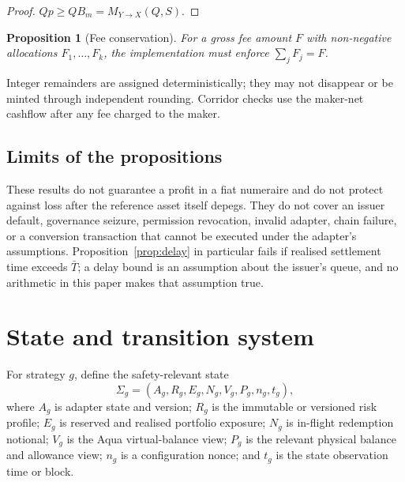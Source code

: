 \documentclass[10pt,twocolumn]{article}
\newtheorem{proposition}{Proposition}
\theoremstyle{definition}
\newcommand{\Mb}{M_{Y\to X}}
\newcommand{\Bm}{B_{m}}
\begin{document}
\begin{proof}
$Qp \ge Q\Bm = \Mb(Q,S)$.
\end{proof}

\begin{proposition}[Fee conservation]
For a gross fee amount $F$ with non-negative allocations $F_1,\dots,F_k$, the implementation must enforce
$\sum_j F_j = F$.
\end{proposition}

\noindent Integer remainders are assigned deterministically; they may not disappear or be minted through
independent rounding. Corridor checks use the maker-net cashflow after any fee charged to the maker.

\subsection*{Limits of the propositions}

These results do not guarantee a profit in a fiat numeraire and do not protect against loss after the reference
asset itself depegs. They do not cover an issuer default, governance seizure, permission revocation, invalid
adapter, chain failure, or a conversion transaction that cannot be executed under the adapter's assumptions.
Proposition~\ref{prop:delay} in particular fails if realised settlement time exceeds $\bar T$; a delay bound is an
assumption about the issuer's queue, and no arithmetic in this paper makes that assumption true.

\section{State and transition system}

For strategy $g$, define the safety-relevant state
\[
  \Sigma_g = (A_g, R_g, E_g, N_g, V_g, P_g, n_g, t_g),
\]
where $A_g$ is adapter state and version; $R_g$ is the immutable or versioned risk profile; $E_g$ is reserved and
realised portfolio exposure; $N_g$ is in-flight redemption notional; $V_g$ is the Aqua virtual-balance view; $P_g$
is the relevant physical balance and allowance view; $n_g$ is a configuration nonce; and $t_g$ is the state
observation time or block.
\end{document}

